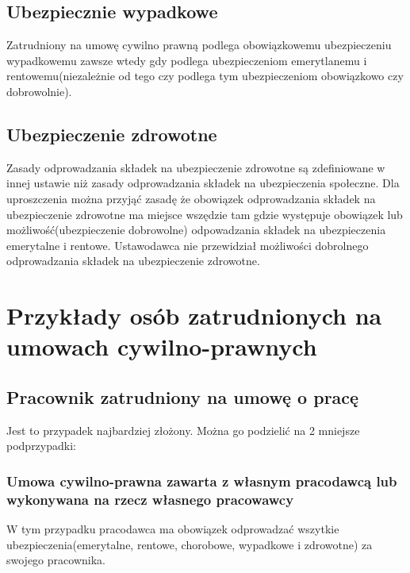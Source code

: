 \subsection[Ubezpiecznie wypadkowe][Ubezpiecznie wypadkowe]{Ubezpiecznie wypadkowe}
Zatrudniony na umowę cywilno prawną podlega obowiązkowemu ubezpieczeniu wypadkowemu zawsze wtedy gdy podlega ubezpieczeniom emerytlanemu i rentowemu(niezależnie od tego czy podlega tym ubezpieczeniom obowiązkowo czy dobrowolnie).

\subsection[Ubezpieczenie zdrowotne][Ubezpieczenie zdrowotne]{Ubezpieczenie zdrowotne}
Zasady odprowadzania składek na ubezpieczenie zdrowotne są zdefiniowane w innej ustawie niż zasady odprowadzania składek na ubezpieczenia społeczne. Dla uproszczenia można przyjąć zasadę że obowiązek odprowadzania składek na ubezpieczenie zdrowotne ma miejsce wszędzie tam gdzie występuje obowiązek lub możliwość(ubezpieczenie dobrowolne) odpowadzania składek na ubezpieczenia emerytalne i rentowe. Ustawodawca nie przewidział możliwości dobrolnego odprowadzania składek na ubezpieczenie zdrowotne.

\section[Przykłady osób zatrudnionych na umowach cywilno-prawnych][Przykłady osób zatrudnionych na umowach cywilno-prawnych]{Przykłady osób zatrudnionych na umowach cywilno-prawnych}
\label{przykladyOsob}

\subsection[Pracownik zatrudniony na umowę o pracę][Pracownik zatrudniony na umowę o pracę]{Pracownik zatrudniony na umowę o pracę}
\label{umowaOPrace}
Jest to przypadek najbardziej złożony. Można go podzielić na 2 mniejsze podprzypadki:

\subsubsection{Umowa cywilno-prawna zawarta z własnym pracodawcą lub wykonywana na rzecz własnego pracowawcy}
W tym przypadku pracodawca ma obowiązek odprowadzać wszytkie ubezpieczenia(emerytalne, rentowe, chorobowe, wypadkowe i zdrowotne) za swojego pracownika.

